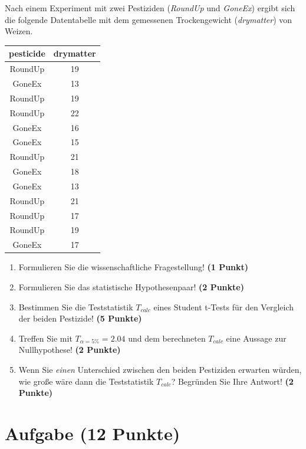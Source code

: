 \documentclass[a4paper, 10pt]{scrartcl}\usepackage[]{graphicx}\usepackage[]{xcolor}
\begin{document}
Nach einem Experiment mit zwei Pestiziden (\textit{RoundUp} und
\textit{GoneEx}) ergibt sich die folgende Datentabelle mit dem gemessenen
Trockengewicht (\textit{drymatter}) von Weizen.

\begin{table}[!h]
\centering
\begin{tabular}{cc}
\toprule
pesticide & drymatter\\
\midrule
RoundUp & 19\\
GoneEx & 13\\
RoundUp & 19\\
RoundUp & 22\\
GoneEx & 16\\
\addlinespace
GoneEx & 15\\
RoundUp & 21\\
GoneEx & 18\\
GoneEx & 13\\
RoundUp & 21\\
\addlinespace
RoundUp & 17\\
RoundUp & 19\\
GoneEx & 17\\
\bottomrule
\end{tabular}
\end{table}



\begin{enumerate}
  \item Formulieren Sie die wissenschaftliche Fragestellung! \textbf{(1 Punkt)}
  \item Formulieren Sie das statistische Hypothesenpaar! \textbf{(2
      Punkte)}
  \item Bestimmen Sie die Teststatistik $T_{calc}$ eines Student t-Tests f{\"u}r den
  Vergleich der beiden Pestizide! \textbf{(5 Punkte)}
\item Treffen Sie mit $T_{\alpha = 5\%} = 2.04$ und dem berechneten $T_{calc}$ eine Aussage
  zur Nullhypothese! \textbf{(2 Punkte)}
\item Wenn Sie \textit{einen} Unterschied zwischen den beiden
  Pestiziden erwarten w{\"u}rden, wie gro{\ss}e w{\"a}re dann die Teststatistik
  $T_{calc}$? Begr{\"u}nden Sie Ihre Antwort! \textbf{(2 Punkte)}
\end{enumerate} 
\clearpage

\section{Aufgabe \hfill (12 Punkte)}
\end{document}
